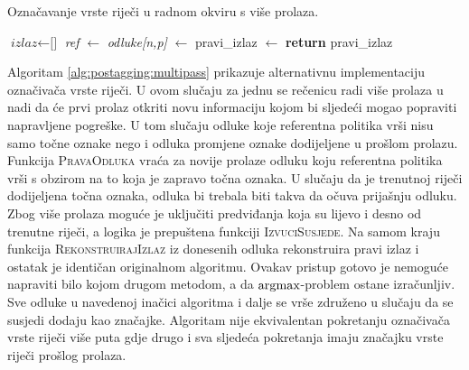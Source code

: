 \begin{algorithm}
\caption{Označavanje vrste riječi u radnom okviru \lts{} s više prolaza.}\label{alg:postagging:multipass}
\begin{algorithmic}[1]
\State $\textit{izlaz} \gets \text{[]}$
    \State \textit{ref} $\gets$ 
    \State \textit{odluke[n,p]} $\gets$ 
  \EndFor
\EndFor
\State pravi\_izlaz $\gets$ 
\State {}
\State \textbf{return} pravi\_izlaz
\EndFunction
\end{algorithmic}
\end{algorithm}

Algoritam \ref{alg:postagging:multipass} prikazuje alternativnu implementaciju
označivača vrste riječi. U ovom slučaju za jednu se rečenicu radi više prolaza u
nadi da će prvi prolaz otkriti novu informaciju kojom bi sljedeći mogao
popraviti napravljene pogreške. U tom slučaju odluke koje referentna politika vrši
nisu samo točne oznake nego i odluka promjene oznake dodijeljene u prošlom
prolazu. Funkcija \textsc{PravaOdluka} vraća za novije prolaze odluku koju
referentna politika vrši s obzirom na to koja je zapravo točna oznaka. U slučaju
da je trenutnoj riječi dodijeljena točna oznaka, odluka bi trebala biti takva da
očuva prijašnju odluku. Zbog više prolaza moguće je uključiti predviđanja koja
su lijevo i desno od trenutne riječi, a logika je prepuštena funkciji
\textsc{IzvuciSusjede}. Na samom kraju funkcija \textsc{RekonstruirajIzlaz} iz
donesenih odluka rekonstruira pravi izlaz i ostatak je identičan originalnom
algoritmu. Ovakav pristup gotovo je nemoguće napraviti bilo kojom drugom
metodom, a da $\operatorname*{argmax}$-problem ostane izračunljiv. Sve odluke u navedenoj
inačici algoritma i dalje se vrše združeno u slučaju da se susjedi dodaju kao
značajke. Algoritam nije ekvivalentan pokretanju označivača vrste riječi više
puta gdje drugo i sva sljedeća pokretanja imaju značajku vrste riječi prošlog
prolaza.
